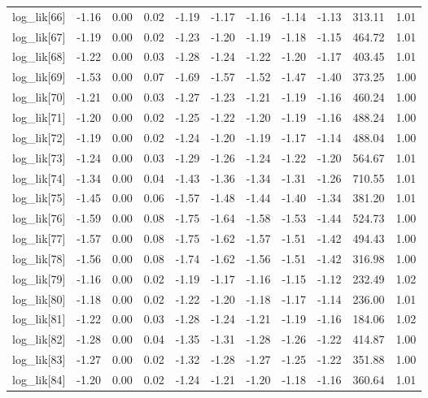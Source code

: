 \begin{table}[ht]
\begin{tabular}{rrrrrrrrrrr}
  log\_lik[66] & -1.16 & 0.00 & 0.02 & -1.19 & -1.17 & -1.16 & -1.14 & -1.13 & 313.11 & 1.01 \\ 
  log\_lik[67] & -1.19 & 0.00 & 0.02 & -1.23 & -1.20 & -1.19 & -1.18 & -1.15 & 464.72 & 1.01 \\ 
  log\_lik[68] & -1.22 & 0.00 & 0.03 & -1.28 & -1.24 & -1.22 & -1.20 & -1.17 & 403.45 & 1.01 \\ 
  log\_lik[69] & -1.53 & 0.00 & 0.07 & -1.69 & -1.57 & -1.52 & -1.47 & -1.40 & 373.25 & 1.00 \\ 
  log\_lik[70] & -1.21 & 0.00 & 0.03 & -1.27 & -1.23 & -1.21 & -1.19 & -1.16 & 460.24 & 1.00 \\ 
  log\_lik[71] & -1.20 & 0.00 & 0.02 & -1.25 & -1.22 & -1.20 & -1.19 & -1.16 & 488.24 & 1.00 \\ 
  log\_lik[72] & -1.19 & 0.00 & 0.02 & -1.24 & -1.20 & -1.19 & -1.17 & -1.14 & 488.04 & 1.00 \\ 
  log\_lik[73] & -1.24 & 0.00 & 0.03 & -1.29 & -1.26 & -1.24 & -1.22 & -1.20 & 564.67 & 1.01 \\ 
  log\_lik[74] & -1.34 & 0.00 & 0.04 & -1.43 & -1.36 & -1.34 & -1.31 & -1.26 & 710.55 & 1.01 \\ 
  log\_lik[75] & -1.45 & 0.00 & 0.06 & -1.57 & -1.48 & -1.44 & -1.40 & -1.34 & 381.20 & 1.01 \\ 
  log\_lik[76] & -1.59 & 0.00 & 0.08 & -1.75 & -1.64 & -1.58 & -1.53 & -1.44 & 524.73 & 1.00 \\ 
  log\_lik[77] & -1.57 & 0.00 & 0.08 & -1.75 & -1.62 & -1.57 & -1.51 & -1.42 & 494.43 & 1.00 \\ 
  log\_lik[78] & -1.56 & 0.00 & 0.08 & -1.74 & -1.62 & -1.56 & -1.51 & -1.42 & 316.98 & 1.00 \\ 
  log\_lik[79] & -1.16 & 0.00 & 0.02 & -1.19 & -1.17 & -1.16 & -1.15 & -1.12 & 232.49 & 1.02 \\ 
  log\_lik[80] & -1.18 & 0.00 & 0.02 & -1.22 & -1.20 & -1.18 & -1.17 & -1.14 & 236.00 & 1.01 \\ 
  log\_lik[81] & -1.22 & 0.00 & 0.03 & -1.28 & -1.24 & -1.21 & -1.19 & -1.16 & 184.06 & 1.02 \\ 
  log\_lik[82] & -1.28 & 0.00 & 0.04 & -1.35 & -1.31 & -1.28 & -1.26 & -1.22 & 414.87 & 1.00 \\ 
  log\_lik[83] & -1.27 & 0.00 & 0.02 & -1.32 & -1.28 & -1.27 & -1.25 & -1.22 & 351.88 & 1.00 \\ 
  log\_lik[84] & -1.20 & 0.00 & 0.02 & -1.24 & -1.21 & -1.20 & -1.18 & -1.16 & 360.64 & 1.01 \\ 

\end{tabular}
\end{table}
